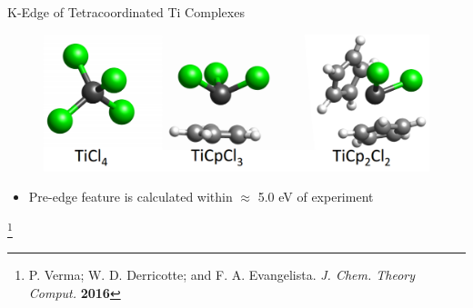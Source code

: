 \documentclass[t]{beamer}
\newcommand\blfootnote[1]{%
  \begingroup
  \renewcommand\thefootnote{}\footnote{#1}%
  \addtocounter{footnote}{-1}%
  \endgroup
}
\begin{document}
\begin{frame}{K-Edge of Tetracoordinated Ti Complexes}
\begin{figure}
\includegraphics[scale=0.3]{Ti_structs.png}
\end{figure}

\begin{table}[!t]
\footnotesize
\caption*{Pre-Edge Contributions for TiCl$_4$}
\end{table}
\begin{itemize}
\item Pre-edge feature is calculated within $\approx$ 5.0 eV of experiment
\end{itemize}
\blfootnote{P. Verma; W. D. Derricotte; and F. A. Evangelista. \textit{J. Chem. Theory Comput.} \textbf{2016}}
\end{frame}
\end{document}
